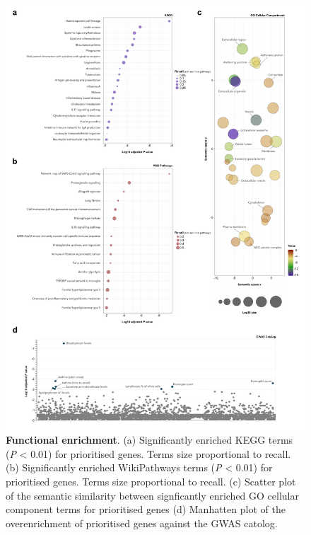 \documentclass[
  11,
  a4paper,
]{article}
\begin{document}
\begin{figure}

{\centering \includegraphics{../img/Supplementary_Figure_5.png}

}

\caption{\textbf{Functional enrichment}. (a) Significantly enriched KEGG
terms (\emph{P} \textless{} 0.01) for prioritised genes. Terms size
proportional to recall. (b) Significantly enriched WikiPathways terms
(\emph{P} \textless{} 0.01) for prioritised genes. Terms size
proportional to recall. (c) Scatter plot of the semantic similarity
between signficantly enriched GO cellular component terms for
prioritised genes (d) Manhatten plot of the overenrichment of
prioritised genes against the GWAS catolog.}

\end{figure}
\end{document}
